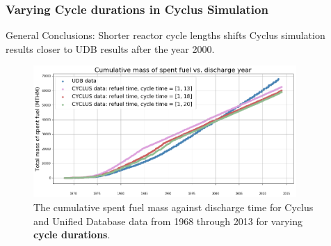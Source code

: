 \begin{frame}
  \frametitle{Varying Cycle durations in Cyclus Simulation}
  General Conclusions: Shorter reactor cycle lengths shifts Cyclus simulation results closer to 
    UDB results after the year 2000. 
  \begin{figure}[htbp!]
      \begin{center}
        \includegraphics[height=5cm]{../figures/cumulative_mass_udb_cyclus_cycletime}
      \end{center}
      \caption{The cumulative spent fuel mass against discharge time
      for Cyclus and Unified Database data from 1968 through 2013 for varying
      \textbf{cycle durations}.}
  \end{figure}  
\end{frame}